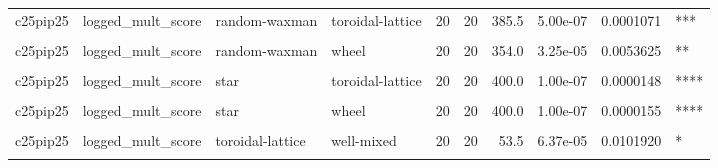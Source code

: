 \documentclass[
]{book}
\begin{document}
\begin{table}
\begin{tabular}{l|l|l|l|r|r|r|r|r|l}
\cellcolor{gray!6}{c25pip25} & \cellcolor{gray!6}{logged\_mult\_score} & \cellcolor{gray!6}{random-waxman} & \cellcolor{gray!6}{star} & \cellcolor{gray!6}{20} & \cellcolor{gray!6}{20} & \cellcolor{gray!6}{0.0} & \cellcolor{gray!6}{1.00e-07} & \cellcolor{gray!6}{0.0000155} & \cellcolor{gray!6}{****}\\
\hline
c25pip25 & logged\_mult\_score & random-waxman & toroidal-lattice & 20 & 20 & 385.5 & 5.00e-07 & 0.0001071 & ***\\
\hline
\cellcolor{gray!6}{c25pip25} & \cellcolor{gray!6}{logged\_mult\_score} & \cellcolor{gray!6}{random-waxman} & \cellcolor{gray!6}{well-mixed} & \cellcolor{gray!6}{20} & \cellcolor{gray!6}{20} & \cellcolor{gray!6}{354.5} & \cellcolor{gray!6}{2.91e-05} & \cellcolor{gray!6}{0.0048430} & \cellcolor{gray!6}{**}\\
\hline
c25pip25 & logged\_mult\_score & random-waxman & wheel & 20 & 20 & 354.0 & 3.25e-05 & 0.0053625 & **\\
\hline
\cellcolor{gray!6}{c25pip25} & \cellcolor{gray!6}{logged\_mult\_score} & \cellcolor{gray!6}{random-waxman} & \cellcolor{gray!6}{windmill} & \cellcolor{gray!6}{20} & \cellcolor{gray!6}{20} & \cellcolor{gray!6}{396.0} & \cellcolor{gray!6}{1.00e-07} & \cellcolor{gray!6}{0.0000253} & \cellcolor{gray!6}{****}\\
\hline
c25pip25 & logged\_mult\_score & star & toroidal-lattice & 20 & 20 & 400.0 & 1.00e-07 & 0.0000148 & ****\\
\hline
\cellcolor{gray!6}{c25pip25} & \cellcolor{gray!6}{logged\_mult\_score} & \cellcolor{gray!6}{star} & \cellcolor{gray!6}{well-mixed} & \cellcolor{gray!6}{20} & \cellcolor{gray!6}{20} & \cellcolor{gray!6}{400.0} & \cellcolor{gray!6}{1.00e-07} & \cellcolor{gray!6}{0.0000151} & \cellcolor{gray!6}{****}\\
\hline
c25pip25 & logged\_mult\_score & star & wheel & 20 & 20 & 400.0 & 1.00e-07 & 0.0000155 & ****\\
\hline
\cellcolor{gray!6}{c25pip25} & \cellcolor{gray!6}{logged\_mult\_score} & \cellcolor{gray!6}{star} & \cellcolor{gray!6}{windmill} & \cellcolor{gray!6}{20} & \cellcolor{gray!6}{20} & \cellcolor{gray!6}{400.0} & \cellcolor{gray!6}{1.00e-07} & \cellcolor{gray!6}{0.0000148} & \cellcolor{gray!6}{****}\\
\hline
c25pip25 & logged\_mult\_score & toroidal-lattice & well-mixed & 20 & 20 & 53.5 & 6.37e-05 & 0.0101920 & *\\
\hline
\cellcolor{gray!6}{c25pip25} & \cellcolor{gray!6}{logged\_mult\_score} & \cellcolor{gray!6}{toroidal-lattice} & \cellcolor{gray!6}{wheel} & \cellcolor{gray!6}{20} & \cellcolor{gray!6}{20} & \cellcolor{gray!6}{200.0} & \cellcolor{gray!6}{1.00e+00} & \cellcolor{gray!6}{1.0000000} & \cellcolor{gray!6}{ns}\\

\end{tabular}
\end{table}
\end{document}
